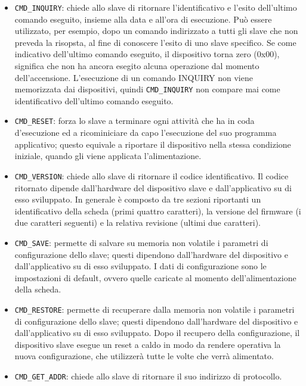 \begin{itemize}
\item \texttt{CMD\_INQUIRY}: chiede allo slave di ritornare l'identificativo e 
l'esito dell'ultimo comando eseguito,
insieme alla data e all'ora di esecuzione. Pu\`o essere utilizzato, per esempio, dopo un comando indirizzato a tutti gli 
slave che non preveda la risopsta, al fine di conoscere l'esito di uno slave specifico. Se come indicativo dell'ultimo
comando eseguito, il dispositivo torna zero (0x00), significa che non ha ancora esegito alcuna operazione dal momento
dell'accensione. L'esecuzione di un comando INQUIRY non viene memorizzata dai dispositivi, quindi \texttt{CMD\_INQUIRY} non
compare mai come identificativo dell'ultimo comando eseguito.
\item \texttt{CMD\_RESET}: forza lo slave a terminare ogni attivit\`a che ha in coda d'esecuzione ed a ricominiciare da
capo l'esecuzione del suo programma applicativo; questo equivale a riportare il dispositivo nella stessa condizione iniziale,
quando gli viene applicata l'alimentazione.
\item \texttt{CMD\_VERSION}: chiede allo slave di ritornare il codice identificativo. Il codice ritornato dipende dall'hardware
del dispositivo slave e dall'applicativo su di esso sviluppato. In generale \`e composto da tre sezioni riportanti un
identificativo della scheda (primi quattro caratteri), la versione del firmware (i due caratteri seguenti) e la relativa revisione
(ultimi due caratteri).
\item \texttt{CMD\_SAVE}: permette di salvare su memoria non volatile i parametri di configurazione dello slave;
questi dipendono dall'hardware del dispositivo e dall'applicativo su di esso sviluppato. I dati di configurazione sono le
impostazioni di default, ovvero quelle caricate al momento dell'alimentazione della scheda.
\item \texttt{CMD\_RESTORE}: permette di recuperare dalla memoria non volatile i parametri di configurazione dello slave;
questi dipendono dall'hardware del dispositivo e dall'applicativo su di esso sviluppato. Dopo il recupero della configurazione,
il dispositivo slave esegue un reset a caldo in modo da rendere operativa la nuova configurazione, che utilizzer\`a tutte le volte
che verr\`a alimentato.
\item \texttt{CMD\_GET\_ADDR}: chiede allo slave di ritornare il suo indirizzo di protocollo.

\end{itemize}
